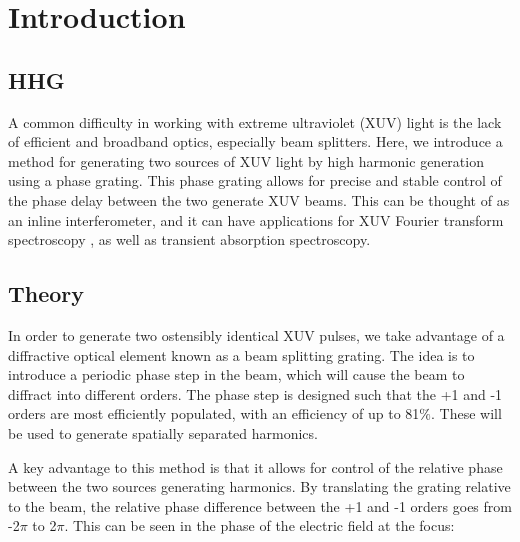 \chapter{Introduction}
\label{Intro}

\section{HHG}
\label{intro_HHG}

A common difficulty in working with extreme ultraviolet (XUV) light is the lack of efficient and broadband optics, especially beam splitters. Here, we introduce a method for generating two sources of XUV light by high harmonic generation using a phase grating.  This phase grating allows for precise and stable control of the phase delay between the two generate XUV beams.  This can be thought of as an inline interferometer, and it can have applications for XUV Fourier transform spectroscopy , as well as transient absorption spectroscopy.

\section{Theory}
\label{theory_ts}

In order to generate two ostensibly identical XUV pulses, we take advantage of a diffractive optical element known as a beam splitting grating.   The idea is to introduce a periodic phase step in the beam, which will cause the beam to diffract into different orders.  The phase step is designed such that the +1 and -1 orders are most efficiently populated, with an efficiency of up to 81$\%$.  These will be used to generate spatially separated harmonics\cite{diffuse}.

A key advantage to this method is that it allows for control of the relative phase between the two sources generating harmonics.  By translating the grating relative to the beam, the relative phase difference between the +1 and -1 orders goes from -2$\pi$ to 2$\pi$.  This can be seen in the phase of the electric field at the focus:


